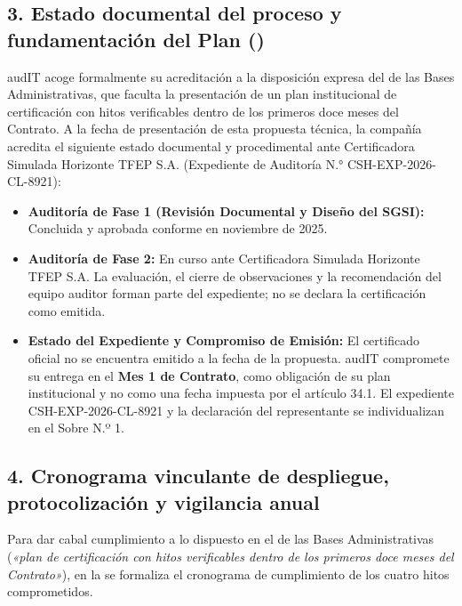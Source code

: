 \subsection*{3. Estado documental del proceso y fundamentación del Plan ()}
audIT acoge formalmente su acreditación a la disposición expresa del  de las Bases Administrativas, que faculta la presentación de un plan institucional de certificación con hitos verificables dentro de los primeros doce meses del Contrato. A la fecha de presentación de esta propuesta técnica, la compañía acredita el siguiente estado documental y procedimental ante Certificadora Simulada Horizonte TFEP S.A. (Expediente de Auditoría N.° CSH-EXP-2026-CL-8921):
\begin{itemize}
  \item \textbf{Auditoría de Fase 1 (Revisión Documental y Diseño del SGSI):} Concluida y aprobada conforme en noviembre de 2025.
  \item \textbf{Auditoría de Fase 2:} En curso ante Certificadora Simulada Horizonte TFEP S.A. La evaluación, el cierre de observaciones y la recomendación del equipo auditor forman parte del expediente; no se declara la certificación como emitida.
  \item \textbf{Estado del Expediente y Compromiso de Emisión:} El certificado oficial no se encuentra emitido a la fecha de la propuesta. audIT compromete su entrega en el \textbf{Mes 1 de Contrato}, como obligación de su plan institucional y no como una fecha impuesta por el artículo 34.1. El expediente CSH-EXP-2026-CL-8921 y la declaración del representante se individualizan en el Sobre N.º 1.
\end{itemize}

\subsection*{4. Cronograma vinculante de despliegue, protocolización y vigilancia anual}
Para dar cabal cumplimiento a lo dispuesto en el  de las Bases Administrativas (\textit{«plan de certificación con hitos verificables dentro de los primeros doce meses del Contrato»}), en la  se formaliza el cronograma de cumplimiento de los cuatro hitos comprometidos.

